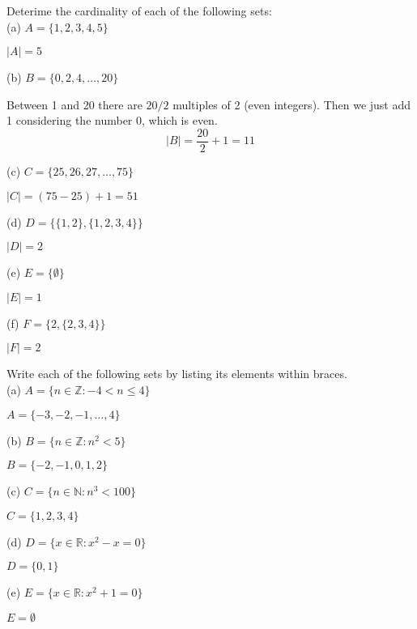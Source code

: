 \documentclass[12pt]{article}
\newcommand{\Z}{\mathbb{Z}}
\newenvironment{problem}[2][Problem]{\begin{trivlist}
		\item[\hskip \labelsep {\bfseries #1}\hskip \labelsep {\bfseries #2.}]}{\end{trivlist}}
\newenvironment{solution}[2][Solution]{\begin{trivlist}
		\item[\hskip \labelsep {\bfseries #1}\hskip \labelsep {\bfseries #2.}]}{\end{trivlist}}
\begin{document}
	\begin{problem}{3}
		Deterime the cardinality of each of the following sets:\\
		
		(a) $A=\{1,2,3,4,5\}$
		\begin{solution}{a}
			$|A|=5$
		\end{solution}
	
		(b) $B=\{0,2,4,\ldots, 20\}$
		\begin{solution}{b}
			Between 1 and 20 there are $20/2$ multiples of 2 (even integers). Then we just add 1 considering the number 0, which is even.
			\begin{equation*}
				|B|=\frac{20}{2} + 1 = 11
			\end{equation*}
		\end{solution}
		(c) $C=\{25,26,27,\ldots,75\}$
		\begin{solution}{c}
			$|C|=(75-25)+1=51$
		\end{solution}
		(d) $D=\{\{1,2\},\{1,2,3,4\}\}$
		\begin{solution}{d}
			$|D|=2$
		\end{solution}
		(e) $E=\{\emptyset\}$
		\begin{solution}{e}
			$|E|=1$
		\end{solution}
		(f) $F=\{2,\{2,3,4\}\}$
		\begin{solution}{f}
			$|F|=2$
		\end{solution}
	\end{problem}

	\begin{problem}{4}
		Write each of the following sets by listing its elements within braces.\\
		
		(a) $A=\{n\in \Z:-4<n\leq 4\}$
		\begin{solution}{a}
			$A=\{-3,-2,-1,\ldots,4\}$
		\end{solution}
		(b)  $B=\{n\in\Z:n^{2}<5\}$
		\begin{solution}{b}
			$B=\{-2,-1,0,1,2\}$
		\end{solution}
		(c) $C=\{n\in \mathbb{N}:n^{3}<100\}$
		\begin{solution}{c}
			$C=\{1,2,3,4\}$
		\end{solution}
		(d) $D=\{x\in \mathbb{R}:x^{2}-x=0\}$
		\begin{solution}{d}
			$D=\{0,1\}$
		\end{solution}
		(e) $E=\{x\in \mathbb{R}:x^{2}+1=0\}$
		\begin{solution}{e}
			$E=\emptyset$
		\end{solution}
	\end{problem}
\end{document}
